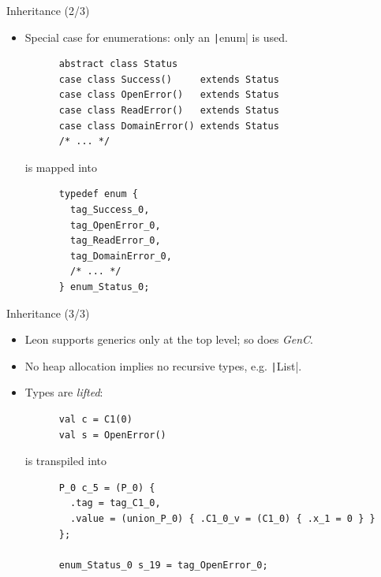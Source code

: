 \documentclass[xcolor={usenames,dvipsnames}]{beamer}
\newcommand{\GenC}{\emph{GenC}\xspace}
\newcommand{\InlineC}[1]{\texttt|#1|}
\newcommand{\InlineS}[1]{\texttt|#1|}
\begin{document}
\begin{frame}[fragile]{Inheritance (2/3)}

  \begin{itemize}

    \item Special case for enumerations: only an \InlineC{enum} is used.\\
      \begin{verbatim}
      abstract class Status
      case class Success()     extends Status
      case class OpenError()   extends Status
      case class ReadError()   extends Status
      case class DomainError() extends Status
      /* ... */
      \end{verbatim}
      is mapped into
      \begin{verbatim}
      typedef enum {
        tag_Success_0,
        tag_OpenError_0,
        tag_ReadError_0,
        tag_DomainError_0,
        /* ... */
      } enum_Status_0;
      \end{verbatim}

  \end{itemize}

\end{frame}


\begin{frame}[fragile]{Inheritance (3/3)}

  \begin{itemize}

    \item Leon supports generics only at the top level; so does \GenC.

    \item No heap allocation implies \alert{no recursive types}, e.g. \InlineS{List}.

      \pause \vfill

    \item Types are \emph{lifted}:
      \begin{verbatim}
      val c = C1(0)
      val s = OpenError()
      \end{verbatim}
      is transpiled into
      \begin{verbatim}
      P_0 c_5 = (P_0) {
        .tag = tag_C1_0,
        .value = (union_P_0) { .C1_0_v = (C1_0) { .x_1 = 0 } }
      };

      enum_Status_0 s_19 = tag_OpenError_0;
      \end{verbatim}

  \end{itemize}

\end{frame}
\end{document}
